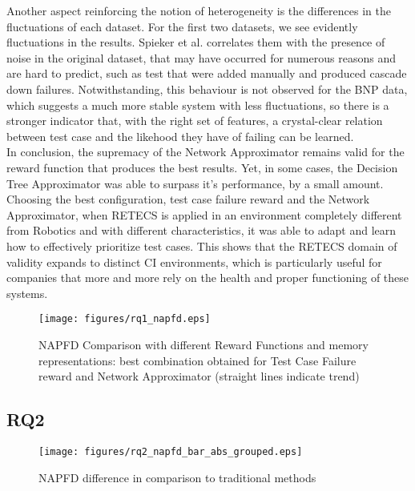 Another aspect reinforcing the notion of heterogeneity is the differences in the fluctuations of each dataset. For the first two datasets, we see evidently fluctuations in the results. Spieker et al. \cite{Spieker} correlates them with the presence of noise in the original dataset, that may have occurred for numerous reasons and are hard to predict, such as test that were added manually and produced cascade down failures. Notwithstanding, this behaviour is not observed for the BNP data, which suggests a much more stable system with less fluctuations, so there is a stronger indicator that, with the right set of features, a crystal-clear relation between test case and the likehood they have of failing can be learned. 
\\

In conclusion, the supremacy of the Network Approximator remains valid for the reward function that produces the best results. Yet, in some cases, the Decision Tree Approximator was able to surpass it's performance, by a small amount. 
Choosing the best configuration, test case failure reward and the Network Approximator, when RETECS is applied in an environment completely different from Robotics and with different characteristics, it was able to adapt and learn how to effectively prioritize test cases. This shows that the RETECS domain of validity expands to distinct CI environments, which is particularly useful for companies that more and more rely on the health and proper functioning of these systems.

\begin{figure*}[htp]
	\centering
	\texttt{[image: figures/rq1\_napfd.eps]}
	\caption{NAPFD Comparison with different Reward Functions and memory representations: best combination obtained for Test Case Failure reward and Network Approximator (straight lines indicate trend)}
	\label{rq1}
\end{figure*}


\subsection{RQ2}

\begin{figure*}[!t]
	\centering
	\texttt{[image: figures/rq2\_napfd\_bar\_abs\_grouped.eps]}
	\caption{NAPFD difference in comparison to traditional methods}
	\label{rq2}
\end{figure*}


